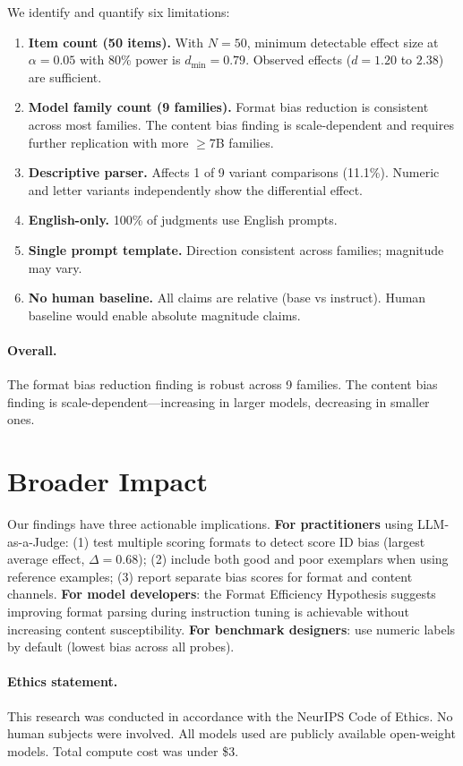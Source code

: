 \documentclass[11pt,twocolumn]{article}
\begin{document}
We identify and quantify six limitations:
\begin{enumerate}
    \item \textbf{Item count (50 items).} With $N=50$, minimum detectable effect size at $\alpha=0.05$ with 80\% power is $d_{\min}=0.79$. Observed effects ($d=1.20$ to $2.38$) are sufficient.
    \item \textbf{Model family count (9 families).} Format bias reduction is consistent across most families. The content bias finding is scale-dependent and requires further replication with more $\geq$7B families.
    \item \textbf{Descriptive parser.} Affects 1 of 9 variant comparisons (11.1\%). Numeric and letter variants independently show the differential effect.
    \item \textbf{English-only.} 100\% of judgments use English prompts.
    \item \textbf{Single prompt template.} Direction consistent across families; magnitude may vary.
    \item \textbf{No human baseline.} All claims are relative (base vs instruct). Human baseline would enable absolute magnitude claims.
\end{enumerate}
\paragraph{Overall.} The format bias reduction finding is robust across 9 families. The content bias finding is scale-dependent---increasing in larger models, decreasing in smaller ones.

\section{Broader Impact}

Our findings have three actionable implications. \textbf{For practitioners} using LLM-as-a-Judge: (1) test multiple scoring formats to detect score ID bias (largest average effect, $\Delta=0.68$); (2) include both good and poor exemplars when using reference examples; (3) report separate bias scores for format and content channels. \textbf{For model developers}: the Format Efficiency Hypothesis suggests improving format parsing during instruction tuning is achievable without increasing content susceptibility. \textbf{For benchmark designers}: use numeric labels by default (lowest bias across all probes).

\paragraph{Ethics statement.}
This research was conducted in accordance with the NeurIPS Code of Ethics. No human subjects were involved. All models used are publicly available open-weight models. Total compute cost was under \$3.
\end{document}
